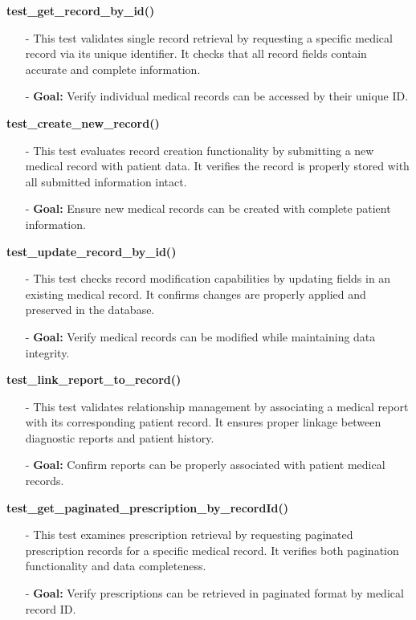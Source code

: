 \documentclass[12pt, titlepage]{article}
\begin{document}
\textbf{test\_get\_record\_by\_id()}
\begin{itemize}
    \item[-] This test validates single record retrieval by requesting a specific medical record via its unique identifier. It checks that all record fields contain accurate and complete information.
    \item[-] \textbf{Goal:} Verify individual medical records can be accessed by their unique ID.
\end{itemize}

\textbf{test\_create\_new\_record()}
\begin{itemize}
    \item[-] This test evaluates record creation functionality by submitting a new medical record with patient data. It verifies the record is properly stored with all submitted information intact.
    \item[-] \textbf{Goal:} Ensure new medical records can be created with complete patient information.
\end{itemize}

\textbf{test\_update\_record\_by\_id()}
\begin{itemize}
    \item[-] This test checks record modification capabilities by updating fields in an existing medical record. It confirms changes are properly applied and preserved in the database.
    \item[-] \textbf{Goal:} Verify medical records can be modified while maintaining data integrity.
\end{itemize}

\textbf{test\_link\_report\_to\_record()}
\begin{itemize}
    \item[-] This test validates relationship management by associating a medical report with its corresponding patient record. It ensures proper linkage between diagnostic reports and patient history.
    \item[-] \textbf{Goal:} Confirm reports can be properly associated with patient medical records.
\end{itemize}

\textbf{test\_get\_paginated\_prescription\_by\_recordId()}
\begin{itemize}
    \item[-] This test examines prescription retrieval by requesting paginated prescription records for a specific medical record. It verifies both pagination functionality and data completeness.
    \item[-] \textbf{Goal:} Verify prescriptions can be retrieved in paginated format by medical record ID.
\end{itemize}
\end{document}
